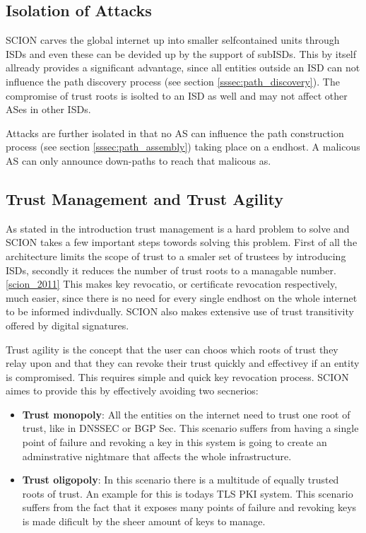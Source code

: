 \documentclass[../eva1_scion.tex]{subfiles}
\begin{document}
    \subsection{Isolation of Attacks}
    SCION carves the global internet up into smaller selfcontained units through ISDs and even these can be devided up by the support of subISDs. This by itself allready provides a significant advantage, since all entities outside an ISD can not influence the path discovery process (see section \ref{sssec:path_discovery}). The compromise of trust roots is isolted to an ISD as well and may not affect other ASes in other ISDs.

    Attacks are further isolated in that no AS can influence the path construction process (see section \ref{sssec:path_assembly}) taking place on a endhost. A malicous AS can only announce down-paths to reach that malicous as. 

    \subsection{Trust Management and Trust Agility}
    As stated in the introduction trust management is a hard problem to solve and SCION takes a few important steps towords solving this problem. First of all the architecture limits the scope of trust to a smaler set of trustees by introducing ISDs, secondly it reduces the number of trust roots to a managable number. \ref{scion_2011} This makes key revocatio, or certificate revocation respectively, much easier, since there is no need for every single endhost on the whole internet to be informed indivdually. SCION also makes extensive use of trust transitivity offered by digital signatures.

    Trust agility is the concept that the user can choos which roots of trust they relay upon and that they can revoke their trust quickly and effectivey if an entity is compromised. This requires simple and quick key revocation process. SCION aimes to provide this by effectively avoiding two secnerios:

    \begin{itemize}
        \item \textbf{Trust monopoly}: All the entities on the internet need to trust one root of trust, like in DNSSEC or BGP Sec. This scenario suffers from having a single point of failure and revoking a key in this system is going to create an adminstrative nightmare that affects the whole infrastructure.
        \item  \textbf{Trust oligopoly}: In this scenario there is a multitude of equally trusted roots of trust. An example for this is todays TLS PKI system. This scenario suffers from the fact that it exposes many points of failure and revoking keys is made dificult by the sheer amount of keys to manage.
    \end{itemize}
\end{document}
